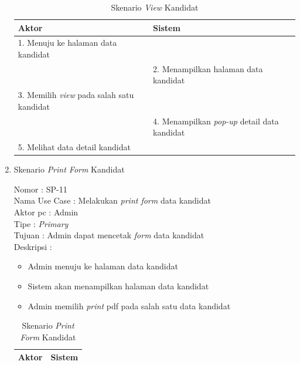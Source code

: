 \begin{enumerate}
\begin{itemize}
\end{itemize}

\begin{table}
	\caption{Skenario \textit{View} Kandidat}
	\centering
	\begin{tabular}{ |  p{73mm} | p{55mm} |}
		\hline 
		\textbf{Aktor} & \textbf{Sistem} \\
		\hline
		
		1.	Menuju ke halaman data kandidat &  \\
		
		\hline
		
		&  2.	Menampilkan halaman data kandidat \\
		
		\hline
		
		3. Memilih \textit{view} pada salah satu kandidat & \\
		
		\hline
		
		& 4.	Menampilkan \textit{pop-up} detail data kandidat \\
		
		\hline
		
		5. Melihat data detail kandidat  & \\
		\hline
		
		
	\end{tabular}
\end{table}

\item Skenario \textit{Print Form} Kandidat

Nomor \kern 3.6pc : SP-11 \\
Nama Use Case : Melakukan \textit{print form} data kandidat \\
Aktor  pc : Admin \\
Tipe \kern 4.6pc : \textit{Primary} \\
Tujuan \kern 3.6pc : Admin dapat mencetak \textit{form} data kandidat \\
Deskripsi \kern 2.5pc : 

\begin{itemize}
	\item Admin menuju ke halaman data kandidat
	\item Sistem akan menampilkan halaman data kandidat
	\item Admin memilih \textit{print} pdf pada salah satu data kandidat
	
\end{itemize}

\begin{table}
	\caption{Skenario \textit{Print Form} Kandidat}
	\centering
	\begin{tabular}{ | p{61.5mm} | p{67mm} |}
		\hline 
		\textbf{Aktor} & \textbf{Sistem} \\
		\hline
		

\end{tabular}
\end{table}
\end{enumerate}
